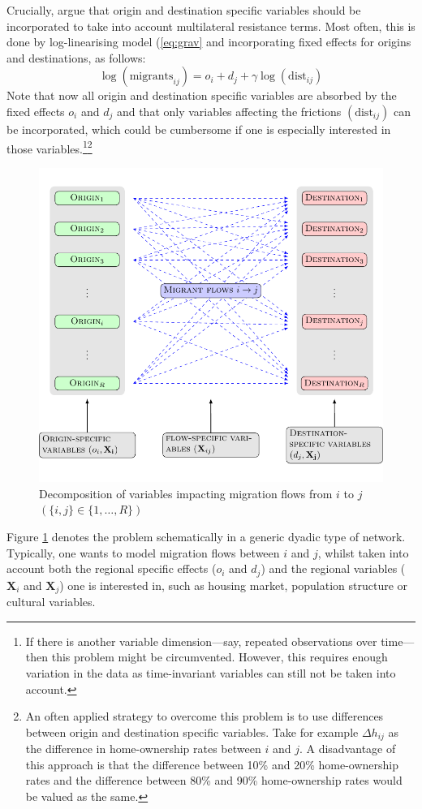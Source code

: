 \documentclass[fleqn,10pt]{SelfArx} %
\begin{document}
Crucially, \citet{anderson2003gravity} argue that origin and destination
specific variables should be incorporated to take into account multilateral
resistance terms. Most often, this is done by log-linearising model
(\ref{eq:grav} and incorporating fixed effects for origins and destinations, as
follows:
\begin{equation}
  \log(\text{migrants}_{ij}) = o_i + d_j +  \gamma\log(\text{dist}_{ij})
  \label{eq:gravfixed}
\end{equation}
Note that now all origin and destination specific variables are absorbed by the
fixed effects $o_i$ and $d_j$ and that only variables affecting the frictions
$(\text{dist}_{ij})$ can be incorporated, which could be cumbersome if one is
especially interested in those variables.\footnote{If there is another variable
  dimension---say, repeated observations over time---then this problem might be
  circumvented. However, this requires enough variation in the data as
  time-invariant variables can still not be taken into account.}\footnote{An
  often applied strategy to overcome this problem is to use differences between
  origin and destination specific variables. Take for example $\Delta h_{ij}$ as
  the difference in home-ownership rates between $i$ and $j$. A disadvantage of
  this approach is that the difference between 10\% and 20\% home-ownership
  rates and the difference between 80\% and 90\% home-ownership rates would be
  valued as the same.}
\begin{figure}[ht]\centering
  \includegraphics[width=\linewidth]{./../../fig/gravity_network.pdf}
  \caption{Decomposition of variables impacting migration flows from $i$ to $j$
    $\left(\{i,j\} \in \{1,\ldots, R\}\right)$}
  \label{fig:gravity_network}
\end{figure}
Figure \ref{fig:gravity_network} denotes the problem schematically in a generic
dyadic type of network. Typically, one wants to model migration flows between
$i$ and $j$, whilst taken into account both the regional specific effects
($o_i$ and $d_j$) and the regional variables ($\mathbf{X}_i$ and
$\mathbf{X}_j$) one is interested in, such as housing market, population
structure or cultural variables.
\end{document}

